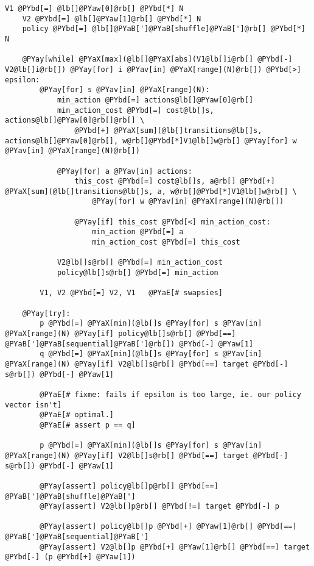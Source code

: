 \begin{Verbatim}[commandchars=@\[\]]
    V1 @PYbd[=] @lb[]@PYaw[0]@rb[] @PYbd[*] N
    V2 @PYbd[=] @lb[]@PYaw[1]@rb[] @PYbd[*] N
    policy @PYbd[=] @lb[]@PYaB[']@PYaB[shuffle]@PYaB[']@rb[] @PYbd[*] N

    @PYay[while] @PYaX[max](@lb[]@PYaX[abs](V1@lb[]i@rb[] @PYbd[-] V2@lb[]i@rb[]) @PYay[for] i @PYav[in] @PYaX[range](N)@rb[]) @PYbd[>] epsilon:
        @PYay[for] s @PYav[in] @PYaX[range](N):
            min_action @PYbd[=] actions@lb[]@PYaw[0]@rb[]
            min_action_cost @PYbd[=] cost@lb[]s, actions@lb[]@PYaw[0]@rb[]@rb[] \
                @PYbd[+] @PYaX[sum](@lb[]transitions@lb[]s, actions@lb[]@PYaw[0]@rb[], w@rb[]@PYbd[*]V1@lb[]w@rb[] @PYay[for] w @PYav[in] @PYaX[range](N)@rb[])

            @PYay[for] a @PYav[in] actions:
                this_cost @PYbd[=] cost@lb[]s, a@rb[] @PYbd[+] @PYaX[sum](@lb[]transitions@lb[]s, a, w@rb[]@PYbd[*]V1@lb[]w@rb[] \
                    @PYay[for] w @PYav[in] @PYaX[range](N)@rb[])

                @PYay[if] this_cost @PYbd[<] min_action_cost:
                    min_action @PYbd[=] a
                    min_action_cost @PYbd[=] this_cost

            V2@lb[]s@rb[] @PYbd[=] min_action_cost
            policy@lb[]s@rb[] @PYbd[=] min_action

        V1, V2 @PYbd[=] V2, V1   @PYaE[# swapsies]

    @PYay[try]:
        p @PYbd[=] @PYaX[min](@lb[]s @PYay[for] s @PYav[in] @PYaX[range](N) @PYay[if] policy@lb[]s@rb[] @PYbd[==] @PYaB[']@PYaB[sequential]@PYaB[']@rb[]) @PYbd[-] @PYaw[1]
        q @PYbd[=] @PYaX[min](@lb[]s @PYay[for] s @PYav[in] @PYaX[range](N) @PYay[if] V2@lb[]s@rb[] @PYbd[==] target @PYbd[-] s@rb[]) @PYbd[-] @PYaw[1]

        @PYaE[# fixme: fails if epsilon is too large, ie. our policy vector isn't]
        @PYaE[# optimal.]
        @PYaE[# assert p == q]

        p @PYbd[=] @PYaX[min](@lb[]s @PYay[for] s @PYav[in] @PYaX[range](N) @PYay[if] V2@lb[]s@rb[] @PYbd[==] target @PYbd[-] s@rb[]) @PYbd[-] @PYaw[1]

        @PYay[assert] policy@lb[]p@rb[] @PYbd[==] @PYaB[']@PYaB[shuffle]@PYaB[']
        @PYay[assert] V2@lb[]p@rb[] @PYbd[!=] target @PYbd[-] p

        @PYay[assert] policy@lb[]p @PYbd[+] @PYaw[1]@rb[] @PYbd[==] @PYaB[']@PYaB[sequential]@PYaB[']
        @PYay[assert] V2@lb[]p @PYbd[+] @PYaw[1]@rb[] @PYbd[==] target @PYbd[-] (p @PYbd[+] @PYaw[1])


\end{Verbatim}
